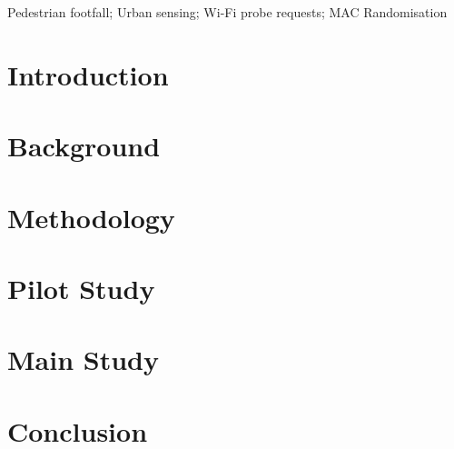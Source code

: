 \documentclass[]{interact}
\theoremstyle{plain}
\theoremstyle{definition}
\theoremstyle{remark}
\begin{document}
	\begin{abstract}
		 \end{abstract}
	\begin{keywords}
		Pedestrian footfall; Urban sensing; Wi-Fi probe requests; MAC Randomisation \end{keywords}
	\section{Introduction}\label{introduction}
		
	\section{Background}\label{previous_work}
		
	\section{Methodology}\label{methodology}
		
	\section{Pilot Study}\label{pilot_study}
		
	\section{Main Study}\label{main_study}
		
	\section{Conclusion}\label{conclusion}
		
	 
\end{document}
